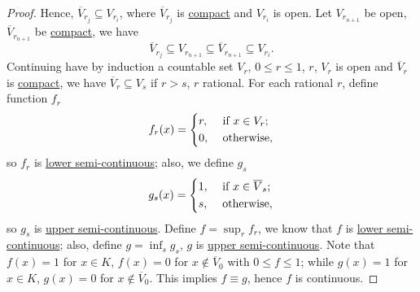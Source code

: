 \begin{proof}
	Hence, \(\overline{V} _{r_j} \subseteq V_{r_i}\), where \(\overline{V} _{r_j}\) is \hyperref[def:compact]{compact} and \(V_{r_i}\) is open. Let \(V_{r_{n+1}}\) be open, \(\overline{V} _{r_{n+1}}\) be \hyperref[def:compact]{compact}, we have
	\[
		\overline{V} _{r_j} \subseteq V_{r_{n+1}} \subseteq \overline{V} _{r_{n+1}} \subseteq V_{r_i}.
	\]
	Continuing have by induction a countable set \(V_r\), \(0 \leq r \leq 1\), \(r\), \(V_r\) is open and \(\overline{V} _r\) is \hyperref[def:compact]{compact}, we have \(\overline{V} _r \subseteq V_s\) if \(r > s\), \(r\) rational. For each rational \(r\), define function \(f_r\)
	\[
		f_r(x) = \begin{dcases}
			r, & \text{ if } x\in V_r ; \\
			0, & \text{ otherwise},
		\end{dcases}
	\]
	so \(f_r\) is \hyperref[def:lower-semi-continuous]{lower semi-continuous}; also, we define \(g_s\)
	\[
		g_s(x) = \begin{dcases}
			1, & \text{ if } x\in \overline{V} _s ; \\
			s, & \text{ otherwise},
		\end{dcases}
	\]
	so \(g_s\) is \hyperref[def:upper-semi-continuous]{upper semi-continuous}. Define \(f = \sup _{r} f_r \), we know that \(f\) is \hyperref[def:lower-semi-continuous]{lower semi-continuous}; also, define \(g = \inf _{s} g_s\), \(g\) is \hyperref[def:upper-semi-continuous]{upper semi-continuous}. Note that \(f(x) = 1\) for \(x\in K\), \(f(x) = 0\) for \(x \notin \overline{V}_0 \) with \(0 \leq f \leq 1\); while \(g(x) = 1\) for \(x\in K\), \(g(x) = 0\) for \(x \notin \overline{V} _0\). This implies \(f\equiv g\), hence \(f\) is continuous.
\end{proof}
